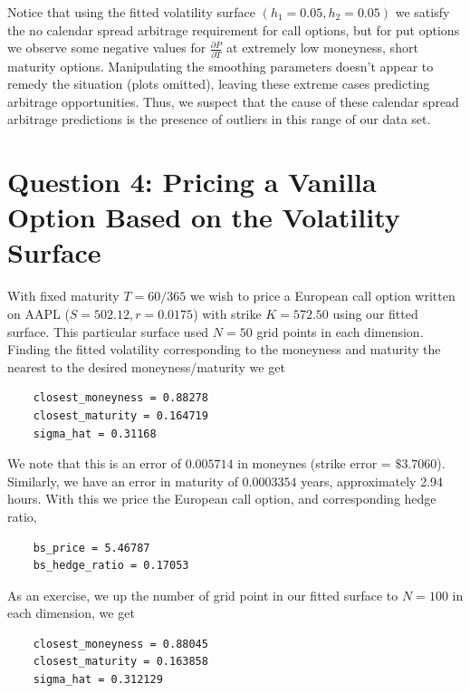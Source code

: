 \documentclass[11pt]{article}
\newlength\tindent
\renewcommand{\indent}{\hspace*{\tindent}}
\begin{document}
\indent Notice that using the fitted volatility surface $(h_1 = 0.05, h_2 = 0.05)$ we satisfy the no calendar spread arbitrage requirement for call options, but for put options we observe some negative values for $\frac{\partial P}{\partial T}$ at extremely low moneyness, short maturity options. Manipulating the smoothing parameters doesn't appear to remedy the situation (plots omitted), leaving these extreme cases predicting arbitrage opportunities. Thus, we suspect that the cause of these calendar spread arbitrage predictions is the presence of outliers in this range of our data set.

\section{Question 4: {\normalfont Pricing a Vanilla Option Based on the Volatility Surface}}

\indent With fixed maturity $T = 60/365$ we wish to price a European call option written on AAPL ($S = 502.12, r = 0.0175$) with strike $K = 572.50$ using our fitted surface. This particular surface used $N = 50$ grid points in each dimension. Finding the fitted volatility corresponding to the moneyness and maturity the nearest to the desired moneyness/maturity we get \\

\begin{lstlisting}
	closest_moneyness = 0.88278
	closest_maturity = 0.164719
	sigma_hat = 0.31168
\end{lstlisting}

\indent We note that this is an error of $0.005714$ in moneynes (strike error = $\$3.7060$). Similarly, we have an error in maturity of $0.0003354$ years, approximately 2.94 hours. With this we price the European call option, and corresponding hedge ratio, \\

\begin{lstlisting}
	bs_price = 5.46787
	bs_hedge_ratio = 0.17053
\end{lstlisting} 

\indent As an exercise, we up the number of grid point in our fitted surface to $N = 100$ in each dimension, we get \\

\begin{lstlisting}
	closest_moneyness = 0.88045	
	closest_maturity = 0.163858
	sigma_hat = 0.312129
\end{lstlisting} 
\end{document}
